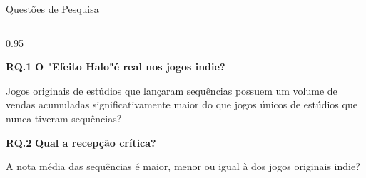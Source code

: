 \begin{frame}{Questões de Pesquisa}
    \vspace{0.0cm}
    
    \begin{columns}[T]
        \begin{column}{0.95\textwidth}
            
            \noindent
            \textbf{RQ.1} \textbf{O "Efeito Halo"é real nos jogos indie?}
            
            \vspace{0.2cm}
            \hangindent=1.2cm  
            {\small Jogos
originais de estúdios que lançaram sequências possuem
um volume de vendas acumuladas significativamente
maior do que jogos únicos de estúdios que nunca tiveram
sequências?}
            
            \vspace{0.6cm}
            
            \noindent
            \textbf{RQ.2} \textbf{Qual a recepção crítica?}
            
            \vspace{0.2cm}
            \hangindent=1.2cm  
            {\small A nota média das sequências
é maior, menor ou igual à dos jogos originais indie?}
            
        \end{column}
    \end{columns}

\end{frame}